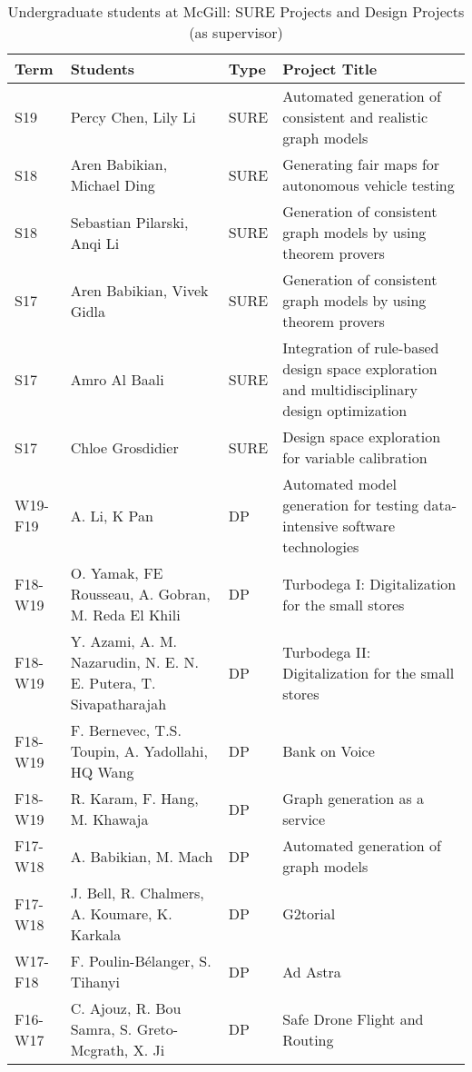 \begin{table}[htb]
\footnotesize
\begin{tabular}{@{}lp{4cm}lp{10cm}@{}}
\toprule
\textbf{Term} & \textbf{Students} & \textbf{Type} & \textbf{Project Title} \\ \midrule
S19 & Percy Chen, Lily Li & SURE& Automated generation of consistent and realistic graph models\\
S18 & Aren Babikian, Michael Ding & SURE & Generating fair maps for autonomous vehicle testing\\
S18 & Sebastian Pilarski, Anqi Li& SURE & Generation of consistent graph models by using theorem provers\\
S17 & Aren Babikian, Vivek Gidla & SURE & Generation of consistent graph models by using theorem provers\\
S17 & Amro Al Baali & SURE & Integration of rule-based design space exploration and multidisciplinary design optimization\\
S17 & Chloe Grosdidier & SURE & Design space exploration for variable calibration\\ \midrule
W19-F19 & A. Li, K Pan & DP  & Automated model generation for testing data-intensive software technologies \\
F18-W19 & O. Yamak, FE Rousseau, A. Gobran, M. Reda El Khili & DP  & Turbodega I: Digitalization for the small stores\\
F18-W19 & Y. Azami, A. M. Nazarudin, N. E. N. E. Putera, T. Sivapatharajah & DP  & Turbodega II: Digitalization for the small stores\\
F18-W19 & F. Bernevec, T.S. Toupin, A. Yadollahi, HQ Wang & DP  & Bank on Voice \\
F18-W19 & R. Karam, F. Hang, M. Khawaja& DP  & Graph generation as a service\\
F17-W18 & A. Babikian, M. Mach & DP  & Automated generation of graph models\\
F17-W18 & J. Bell, R. Chalmers, A. Koumare, K. Karkala & DP & G2torial\\
W17-F18 & F. Poulin-B\'elanger, S. Tihanyi & DP  & Ad Astra\\
F16-W17 & C. Ajouz, R. Bou Samra, S. Greto-Mcgrath, X. Ji & DP  & Safe Drone Flight and Routing\\ %
\bottomrule
\end{tabular}
\caption{Undergraduate students at McGill: SURE Projects and Design Projects (as supervisor)}
\label{tab:ug-supervised}
\end{table}

